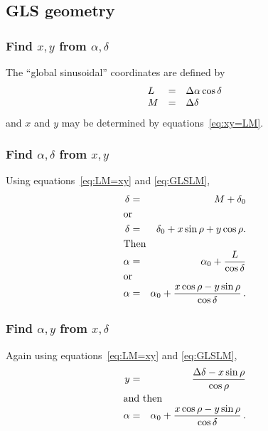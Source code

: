 \subsection{GLS geometry\protect\footnotemark}

\subsubsection{Find $x,y$ from $\alpha,\delta$}

     The ``global sinusoidal'' coordinates are defined by
\begin{eqnarray}
\begin{array}{lcl}
   L & = &\Delta\alpha\cos\delta \\
   M & = &\Delta\delta
\end{array}
\label{eq:GLSLM}
\end{eqnarray}
and $x$ and $y$ may be determined by
equations~\ref{eq:xy=LM}.

\subsubsection{Find $\alpha,\delta$ from $x,y$}

     Using equations~\ref{eq:LM=xy} and \ref{eq:GLSLM},
\begin{eqnarray*}
   \delta & = &M+\delta_0 \\
\noalign{\hbox{or}}
   \delta & = &\delta_0+x\sin\rho+y\cos\rho. \\
\noalign{\hbox{Then}}
   \alpha & = &\alpha_0 + \frac{L}{\cos\delta} \\
\noalign{\hbox{or}}
   \alpha & = &\alpha_0 + \frac{x\cos\rho-y\sin\rho}{\cos\delta} \, .
\end{eqnarray*}

\subsubsection{Find $\alpha,y$ from $x,\delta$}

     Again using equations~\ref{eq:LM=xy} and \ref{eq:GLSLM},
\begin{eqnarray*}
   y      & = &\frac{\Delta\delta - x\sin\rho}{\cos\rho} \\
\noalign{\hbox{and then}}
   \alpha & = &\alpha_0 + \frac{x\cos\rho-y\sin\rho}{\cos\delta} \, .
\end{eqnarray*}

